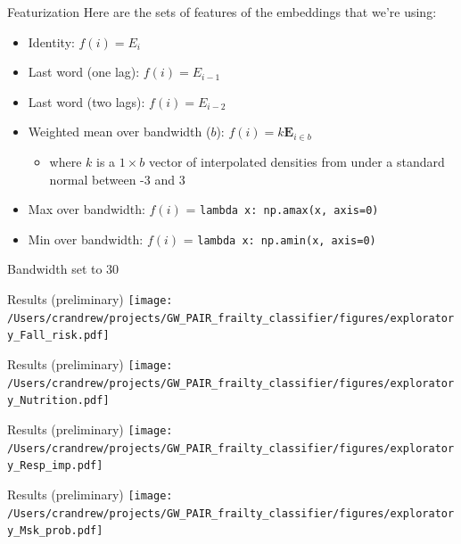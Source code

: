 \documentclass[10pt]{beamer}
\begin{document}
\begin{frame}{Featurization}
Here are the sets of features of the embeddings that we're using:
\begin{itemize}
\item Identity:  $f(i) = E_i$
\item Last word (one lag): $f(i) = E_{i-1}$
\item Last word (two lags): $f(i) = E_{i-2}$
\item Weighted mean over bandwidth ($b$): $f(i) = k\bm{E}_{i \in b}$
	\begin{itemize}
	\item where $k$ is a $1 \times b$ vector of interpolated densities from under a standard normal between -3 and 3
	\end{itemize}
\item Max over bandwidth: $f(i)$ = \texttt{lambda x: np.amax(x, axis=0)}
\item Min over bandwidth: $f(i)$ = \texttt{lambda x: np.amin(x, axis=0)}
\end{itemize}
Bandwidth set to 30
\end{frame}


\begin{frame}{Results (preliminary)}
\texttt{[image: /Users/crandrew/projects/GW\_PAIR\_frailty\_classifier/figures/exploratory\_Fall\_risk.pdf]}
\end{frame}

\begin{frame}{Results (preliminary)}
\texttt{[image: /Users/crandrew/projects/GW\_PAIR\_frailty\_classifier/figures/exploratory\_Nutrition.pdf]}
\end{frame}

\begin{frame}{Results (preliminary)}
\texttt{[image: /Users/crandrew/projects/GW\_PAIR\_frailty\_classifier/figures/exploratory\_Resp\_imp.pdf]}
\end{frame}

\begin{frame}{Results (preliminary)}
\texttt{[image: /Users/crandrew/projects/GW\_PAIR\_frailty\_classifier/figures/exploratory\_Msk\_prob.pdf]}
\end{frame}
\end{document}
